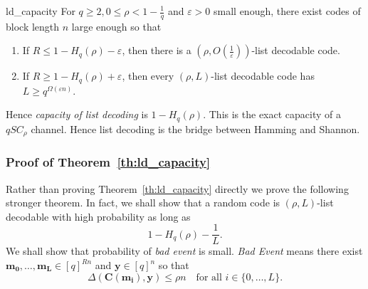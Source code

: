	\begin{theorem}{}{ld_capacity}
		For $q\geq2, 0\leq \rho < 1 - \frac{1}{q}$ and $\varepsilon>0$ small enough, there exist codes of block length $n$ large enough so that 
		\begin{enumerate}[1.]
			\item If $R\leq 1 - H_q(\rho) - \varepsilon$, then there is a $(\rho, O(\frac{1}{\varepsilon}))$-list decodable code.
			\item If $R\geq 1 - H_q(\rho) + \varepsilon$, then every $(\rho, L)$-list decodable code has $L\geq q^{\Omega(\varepsilon n)}$.
		\end{enumerate}  
	\end{theorem}
	
	Hence \emph{capacity of list decoding} is $1 - H_q(\rho)$. This is the exact capacity of a $qSC_{\rho}$ channel. Hence list decoding is the bridge between Hamming and Shannon.
	
	\subsubsection{Proof of Theorem~\ref{th:ld_capacity}}
	Rather than proving Theorem~\ref{th:ld_capacity} directly we prove the following  stronger theorem. In fact, we shall show that a random code is $(\rho, L)$-list decodable with high probability as long as 
	\[
	1 - H_q(\rho) - \frac{1}{L}.
	\]
	We shall show that probability of \emph{bad event} is small. \emph{Bad Event} means there exist $\mathbf{m_0},\ldots,\mathbf{m_L}\in [q]^{Rn}$ and $\mathbf{y}\in[q]^n$ so that 
	\[
	\Delta(\mathbf{C(m_i)}, \mathbf{y}) \leq \rho n \quad \text{for all $i\in \{0,\ldots,L\}$}.
	\]
	
